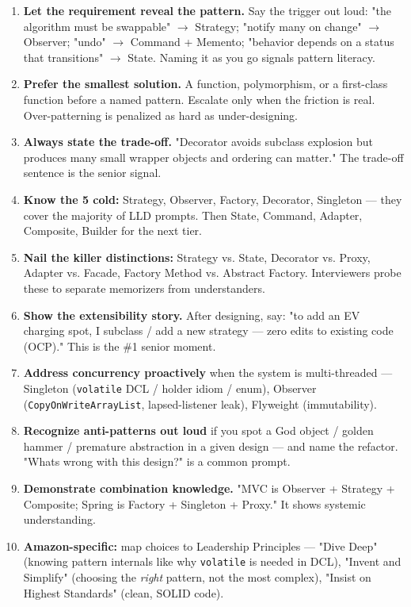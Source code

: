 \documentclass[11pt]{article}
\begin{document}
\begin{enumerate}
\def\labelenumi{\arabic{enumi}.}
\item
  \textbf{Let the requirement reveal the pattern.} Say the trigger out loud: "the algorithm must be swappable" \(\rightarrow\) Strategy; "notify many on change" \(\rightarrow\) Observer; "undo" \(\rightarrow\) Command + Memento; "behavior depends on a status that transitions" \(\rightarrow\) State. Naming it as you go signals pattern literacy.
\item
  \textbf{Prefer the smallest solution.} A function, polymorphism, or a first-class function before a named pattern. Escalate only when the friction is real. Over-patterning is penalized as hard as under-designing.
\item
  \textbf{Always state the trade-off.} "Decorator avoids subclass explosion but produces many small wrapper objects and ordering can matter." The trade-off sentence is the senior signal.
\item
  \textbf{Know the 5 cold:} Strategy, Observer, Factory, Decorator, Singleton --- they cover the majority of LLD prompts. Then State, Command, Adapter, Composite, Builder for the next tier.
\item
  \textbf{Nail the killer distinctions:} Strategy vs. State, Decorator vs. Proxy, Adapter vs. Facade, Factory Method vs. Abstract Factory. Interviewers probe these to separate memorizers from understanders.
\item
  \textbf{Show the extensibility story.} After designing, say: "to add an EV charging spot, I subclass / add a new strategy --- zero edits to existing code (OCP)." This is the \#1 senior moment.
\item
  \textbf{Address concurrency proactively} when the system is multi-threaded --- Singleton (\texttt{volatile} DCL / holder idiom / enum), Observer (\texttt{CopyOnWriteArrayList}, lapsed-listener leak), Flyweight (immutability).
\item
  \textbf{Recognize anti-patterns out loud} if you spot a God object / golden hammer / premature abstraction in a given design --- and name the refactor. "What\textquotesingle s wrong with this design?" is a common prompt.
\item
  \textbf{Demonstrate combination knowledge.} "MVC is Observer + Strategy + Composite; Spring is Factory + Singleton + Proxy." It shows systemic understanding.
\item
  \textbf{Amazon-specific:} map choices to Leadership Principles --- "Dive Deep" (knowing pattern internals like why \texttt{volatile} is needed in DCL), "Invent and Simplify" (choosing the \emph{right} pattern, not the most complex), "Insist on Highest Standards" (clean, SOLID code).
\end{enumerate}
\end{document}
